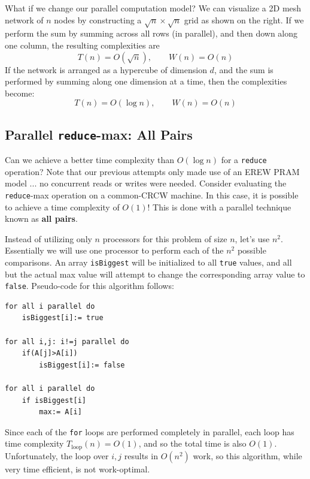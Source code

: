 \documentclass[twoside]{article}
\begin{document}
What if we change our parallel computation model? We can visualize a 2D mesh network of $n$ nodes by constructing a $\sqrt{n} \times \sqrt{n}$ grid as shown on the right. If we perform the sum by summing across all rows (in parallel), and then down along one column, the resulting complexities are
\[
T(n) = O(\sqrt{n}),\qquad W(n) = O(n)
\]
If the network is arranged as a hypercube of dimension $d$, and the sum is performed by summing along one dimension at a time, then the complexities become:
\[
T(n) = O(\log{n}),\qquad W(n) = O(n)
\]


\subsection{Parallel \texttt{reduce}-max: All Pairs}
Can we achieve a better time complexity than $O(\log n)$ for a \texttt{reduce} operation? Note that our previous attempts only made use of an EREW PRAM model ... no concurrent reads or writes were needed. Consider evaluating the \texttt{reduce}-max operation on a common-CRCW machine. In this case, it is possible to achieve a time complexity of $O(1)$! This is done with a parallel technique known as \textbf{all pairs}. 

Instead of utilizing only $n$ processors for this problem of size $n$, let's use $n^2$. Essentially we will use one processor to perform each of the $n^2$ possible comparisons. An array \texttt{isBiggest} will be initialized to all \texttt{true} values, and all but the actual max value will attempt to change the corresponding array value to \texttt{false}. Pseudo-code for this algorithm follows:
\begin{lstlisting}
for all i parallel do
	isBiggest[i]:= true

for all i,j: i!=j parallel do
	if(A[j]>A[i])
		isBiggest[i]:= false

for all i parallel do
	if isBiggest[i]
		max:= A[i]

\end{lstlisting}

Since each of the \texttt{for} loops are performed completely in parallel, each loop has time complexity $T_{\text{loop}}(n) = O(1)$, and so the total time is also $O(1)$. Unfortunately, the loop over $i,j$ results in $O(n^2)$ work, so this algorithm, while very time efficient, is not work-optimal.
\end{document}
